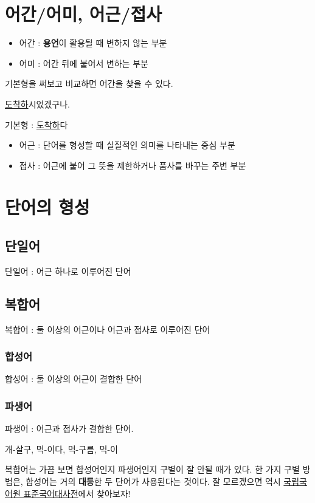 \documentclass[10pt]{report}
\newcommand{\std}{\href{http://stdweb2.korean.go.kr}{\color{blue}국립국어원 표준국어대사전}}
\begin{document}
\section{어간/어미, 어근/접사}
\begin{itemize}
\item 어간 : \textbf{용언}이 활용될 때 변하지 않는 부분
\item 어미 : 어간 뒤에 붙어서 변하는 부분
\end{itemize}

기본형을 써보고 비교하면 어간을 찾을 수 있다. 

\begin{center}
	\underline{도착하}시었겠구나.
	
	기본형 : \underline{도착하}다
\end{center}
\begin{itemize}
\item 어근 : 단어를 형성할 때 실질적인 의미를 나타내는 중심 부분
\item 접사 : 어근에 붙어 그 뜻을 제한하거나 품사를 바꾸는 주변 부분
\end{itemize}

\section{단어의 형성}
\subsection{단일어}
단일어 : 어근 하나로 이루어진 단어

\subsection{복합어}
복합어 : 둘 이상의 어근이나 어근과 접사로 이루어진 단어

\subsubsection{합성어}
합성어 : 둘 이상의 어근이 결합한 단어

\subsubsection{파생어}
파생어 : 어근과 접사가 결합한 단어.
\begin{center}
	개-살구, 먹-이다, 먹-구름, 먹-이
\end{center}
복합어는 가끔 보면 합성어인지 파생어인지 구별이 잘 안될 때가 있다. 한 가지 구별 방법은, 합성어는 거의 \textbf{대등}한 두 단어가 사용된다는 것이다.
잘 모르겠으면 역시 \std 에서 찾아보자!
\end{document}
